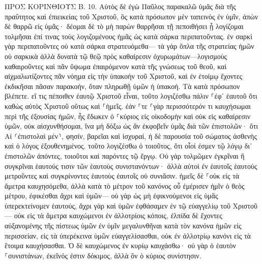 \documentclass[twoside, 9pt]{extreport}
\begin{document}
ΠΡΟΣ ΚΟΡΙΝΘΙΟΥΣ Β.
10.
Αὐτὸς δὲ ἐγὼ Παῦλος παρακαλῶ ὑμᾶς διὰ τῆς πραΰτητος καὶ ἐπιεικείας τοῦ Χριστοῦ, ὃς κατὰ πρόσωπον μὲν ταπεινὸς ἐν ὑμῖν, ἀπὼν δὲ θαρρῶ εἰς ὑμᾶς· 
δέομαι δὲ τὸ μὴ παρὼν θαρρῆσαι τῇ πεποιθήσει ᾗ λογίζομαι τολμῆσαι ἐπί τινας τοὺς λογιζομένους ἡμᾶς ὡς κατὰ σάρκα περιπατοῦντας. 
ἐν σαρκὶ γὰρ περιπατοῦντες οὐ κατὰ σάρκα στρατευόμεθα— 
τὰ γὰρ ὅπλα τῆς στρατείας ἡμῶν οὐ σαρκικὰ ἀλλὰ δυνατὰ τῷ θεῷ πρὸς καθαίρεσιν ὀχυρωμάτων—λογισμοὺς καθαιροῦντες 
καὶ πᾶν ὕψωμα ἐπαιρόμενον κατὰ τῆς γνώσεως τοῦ θεοῦ, καὶ αἰχμαλωτίζοντες πᾶν νόημα εἰς τὴν ὑπακοὴν τοῦ Χριστοῦ, 
καὶ ἐν ἑτοίμῳ ἔχοντες ἐκδικῆσαι πᾶσαν παρακοήν, ὅταν πληρωθῇ ὑμῶν ἡ ὑπακοή. 
Τὰ κατὰ πρόσωπον βλέπετε. εἴ τις πέποιθεν ἑαυτῷ Χριστοῦ εἶναι, τοῦτο λογιζέσθω πάλιν ⸀ἐφ᾽ ἑαυτοῦ ὅτι καθὼς αὐτὸς Χριστοῦ οὕτως καὶ ⸀ἡμεῖς. 
ἐάν ⸀τε ⸀γὰρ περισσότερόν τι καυχήσωμαι περὶ τῆς ἐξουσίας ἡμῶν, ἧς ἔδωκεν ὁ ⸀κύριος εἰς οἰκοδομὴν καὶ οὐκ εἰς καθαίρεσιν ὑμῶν, οὐκ αἰσχυνθήσομαι, 
ἵνα μὴ δόξω ὡς ἂν ἐκφοβεῖν ὑμᾶς διὰ τῶν ἐπιστολῶν· 
ὅτι Αἱ ⸂ἐπιστολαὶ μέν⸃, φησίν, βαρεῖαι καὶ ἰσχυραί, ἡ δὲ παρουσία τοῦ σώματος ἀσθενὴς καὶ ὁ λόγος ἐξουθενημένος. 
τοῦτο λογιζέσθω ὁ τοιοῦτος, ὅτι οἷοί ἐσμεν τῷ λόγῳ δι᾽ ἐπιστολῶν ἀπόντες, τοιοῦτοι καὶ παρόντες τῷ ἔργῳ. 
Οὐ γὰρ τολμῶμεν ἐγκρῖναι ἢ συγκρῖναι ἑαυτούς τισιν τῶν ἑαυτοὺς συνιστανόντων· ἀλλὰ αὐτοὶ ἐν ἑαυτοῖς ἑαυτοὺς μετροῦντες καὶ συγκρίνοντες ἑαυτοὺς ἑαυτοῖς οὐ συνιᾶσιν. 
ἡμεῖς δὲ ⸀οὐκ εἰς τὰ ἄμετρα καυχησόμεθα, ἀλλὰ κατὰ τὸ μέτρον τοῦ κανόνος οὗ ἐμέρισεν ἡμῖν ὁ θεὸς μέτρου, ἐφικέσθαι ἄχρι καὶ ὑμῶν— 
οὐ γὰρ ὡς μὴ ἐφικνούμενοι εἰς ὑμᾶς ὑπερεκτείνομεν ἑαυτούς, ἄχρι γὰρ καὶ ὑμῶν ἐφθάσαμεν ἐν τῷ εὐαγγελίῳ τοῦ Χριστοῦ— 
οὐκ εἰς τὰ ἄμετρα καυχώμενοι ἐν ἀλλοτρίοις κόποις, ἐλπίδα δὲ ἔχοντες αὐξανομένης τῆς πίστεως ὑμῶν ἐν ὑμῖν μεγαλυνθῆναι κατὰ τὸν κανόνα ἡμῶν εἰς περισσείαν, 
εἰς τὰ ὑπερέκεινα ὑμῶν εὐαγγελίσασθαι, οὐκ ἐν ἀλλοτρίῳ κανόνι εἰς τὰ ἕτοιμα καυχήσασθαι. 
Ὁ δὲ καυχώμενος ἐν κυρίῳ καυχάσθω· 
οὐ γὰρ ὁ ἑαυτὸν ⸀συνιστάνων, ἐκεῖνός ἐστιν δόκιμος, ἀλλὰ ὃν ὁ κύριος συνίστησιν. 
\end{document}
